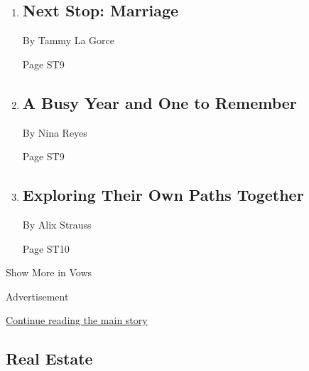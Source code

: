 \begin{enumerate}
\def\labelenumi{\arabic{enumi}.}
\item
  \href{/2020/07/24/fashion/weddings/Sara-Ziff-marries-Reed-Young-at-train-station.html}{}

  \hypertarget{next-stop-marriage}{%
  \subsection{Next Stop: Marriage}\label{next-stop-marriage}}

  By Tammy La Gorce

  Page ST9
\item
  \href{/2020/07/24/fashion/weddings/a-busy-year-and-one-to-remember.html}{}

  \hypertarget{a-busy-year-and-one-to-remember}{%
  \subsection{A Busy Year and One to
  Remember}\label{a-busy-year-and-one-to-remember}}

  By Nina Reyes

  Page ST9
\item
  \href{/2020/07/18/fashion/weddings/exploring-their-own-paths-together.html}{}

  \hypertarget{exploring-their-own-paths-together}{%
  \subsection{Exploring Their Own Paths
  Together}\label{exploring-their-own-paths-together}}

  By Alix Strauss

  Page ST10
\end{enumerate}

Show More in Vows

Advertisement

\protect\hyperlink{after-mid8}{Continue reading the main story}

\hypertarget{real-estate}{%
\subsection{Real Estate}\label{real-estate}}

